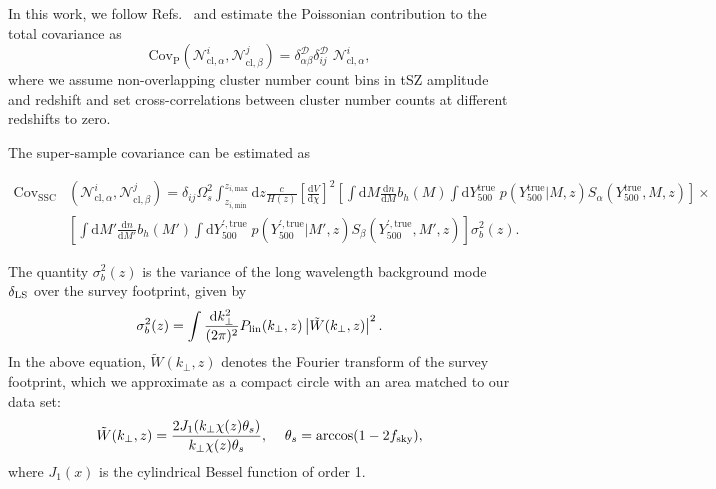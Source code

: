 \documentclass[%
 reprint,
nofootinbib,
 amsmath,amssymb,
 aps,
]{revtex4-1}
\begin{document}
In this work, we follow Refs.~\cite{Schaan:2014, Krause:2017} and estimate the Poissonian contribution to the total covariance as
\begin{equation}
\mathrm{Cov}_{\mathrm{P}}(\mathcal{N}^{i}_{\mathrm{cl}, \alpha} , \mathcal{N}^{j}_{\mathrm{cl}, \beta}) = \delta^{\mathcal{D}}_{\alpha \beta} \delta^{\mathcal{D}}_{ij} \;\mathcal{N}^{i}_{\mathrm{cl}, \alpha} ,
\end{equation}
where we assume non-overlapping cluster number count bins in tSZ amplitude and redshift and set cross-correlations between cluster number counts at different redshifts to zero.

The super-sample covariance can be estimated as \cite{Takada:2014, Schaan:2014, Krause:2017}
\begin{widetext}
\begin{equation}
\begin{aligned}
\mathrm{Cov}_{\mathrm{SSC}}&(\mathcal{N}^{i}_{\mathrm{cl}, \alpha} , \mathcal{N}^{j}_{\mathrm{cl}, \beta}) = \delta_{ij} \Omega_{s}^{2} \int_{z_{i, \mathrm{min}}}^{z_{i, \mathrm{max}}}  \mathrm{d}z \frac{c}{H(z)} \left[\frac{\mathrm{d}V}{\mathrm{d}\chi}\right]^{2}
\left[\int \mathrm{d}M \frac{\mathrm{d}n}{\mathrm{d}M} b_{h}(M) \int \mathrm{d}Y_{500}^{\mathrm{true}}\; p(Y_{500}^{\mathrm{true}}|M, z) S_{\alpha}(Y_{500}^{\mathrm{true}}, M, z)\right] \times \\ 
&\left[\int \mathrm{d}M' \frac{\mathrm{d}n}{\mathrm{d}M'} b_{h}(M') \int \mathrm{d}Y_{500}^{\prime, \mathrm{true}}\; p(Y_{500}^{\prime, \mathrm{true}}|M', z) S_{\beta}(Y_{500}^{\prime, \mathrm{true}}, M', z)\right] \sigma_b^2(z).
\end{aligned}
\end{equation}
\end{widetext}
The quantity $\sigma_b^2(z)$ is the variance of the long wavelength background mode $\delta_{\rm LS}$ over the survey footprint, given by
 \begin{equation}
\sigma_b^2(z) = \int \frac{\mathrm{d}k_\perp^2}{(2\pi)^2}P_{\rm lin}(k_\perp,z)\left|\tilde{W}(k_\perp,z)\right|^2.
\end{equation}
In the above equation, $\tilde{W}(k_\perp,z)$ denotes the Fourier transform of the survey footprint, which we approximate as a compact circle with an area matched to our data set:
\begin{equation}
\tilde{W}(k_\perp,z)=\frac{2 J_1(k_\perp\chi(z)\theta_s)}{k_\perp \chi(z)\theta_s},\hspace{12pt} \theta_s={\rm arccos}(1-2f_{\rm sky}),
\end{equation}
where $J_1(x)$ is the cylindrical Bessel function of order 1.
\end{document}
